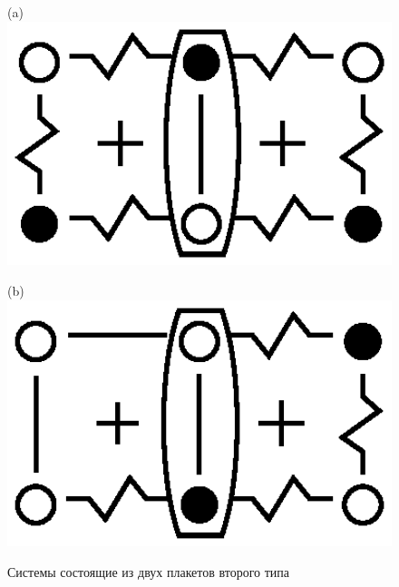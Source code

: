 \documentclass[utf8, babel, sor, jor, amsmath, amssymb, reprint]{elsarticle} %
\begin{document}
\begin{figure}[H]
	\centering
	\begin{minipage}{0.2\textwidth}
		\centering
		(a)
		\includegraphics[width=1\textwidth]{pictures/Type2_3x2.eps}
		\label{fig:Type2_3x2}
	\end{minipage}
	\hspace{20pt}
	\begin{minipage}{0.2\textwidth}
		\centering
		(b)
		\includegraphics[width=1\textwidth]{pictures/Type2_3x2_2.eps}
		\label{fig:Type2_3x2_2}
	\end{minipage}
	\caption{Системы состоящие из двух плакетов второго типа}
	\label{fig:Type2_32}
\end{figure}
\end{document}
